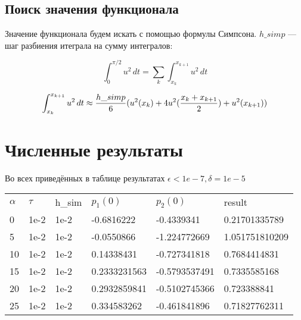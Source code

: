 \documentclass [a4paper, 12pt] {article}
\begin{document}
\subsection {Поиск значения функционала}

Значение функционала будем искать с помощью формулы Симпсона. $h\_simp$ --- шаг разбиения итеграла на сумму интегралов:

$$\int_0^{\pi / 2} u^2 \, dt = \sum_k\int_{x_k}^{x_{k+1}} u^2\, dt$$

$$\int_{x_k}^{x_{k+1}} u^2 \, dt \approx \genfrac{}{}{}{}{h\_simp}{6}( u^2(x_k) + 4  u^2(\genfrac{}{}{}{}{x_k + x_{k+1}}{2}) +  u^2(x_{k+1}))$$

\section {Численные результаты}

Во всех приведённых в таблице результатах $\epsilon < 1e-7, \delta = 1e-5$

\begin{table}[h!]
\begin{center}
\begin{tabular}{llllll}
$\alpha$  & $\tau$ & h\_sim & $p_1(0)$   & $p_2(0)$   & result \\
0   & 1e-2    & 1e-2    & -0.6816222           & -0.4339341          & 0.21701335789   \\
5   & 1e-2    & 1e-2    & -0.0550866 & -1.224772669   & 1.051751810209 \\
10 & 1e-2    & 1e-2    & 0.14338431 & -0.727341818 & 0.7684414831 \\
15 & 1e-2    & 1e-2    & 0.2333231563 & -0.5793537491 & 0.7335585168 \\
20 & 1e-2    & 1e-2    & 0.2932859841   & -0.5102745366   &  0.723388841\\
25 & 1e-2    & 1e-2    & 0.334583262  & -0.461841896   &  0.71827762311 \\
\end{tabular}
\end{center}
\end{table}
\end{document}
